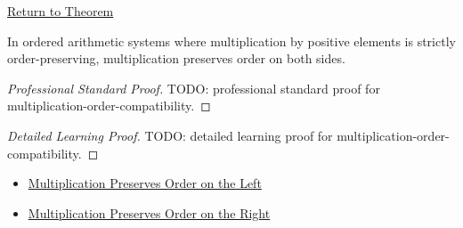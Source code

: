 \newpage
{}
\label{prf:multiplication-order-compatibility}

\begin{remark*}[Return]
\hyperref[prop:multiplication-order-compatibility]{Return to Theorem}
\end{remark*}

\begin{proposition*}
In ordered arithmetic systems where multiplication by positive elements is
strictly order-preserving, multiplication preserves order on both sides.
\end{proposition*}

\begin{proof}[Professional Standard Proof]
\LRAProofBodyStart
TODO: professional standard proof for multiplication-order-compatibility.
\end{proof}

\begin{proof}[Detailed Learning Proof]
\LRAProofBodyStart
TODO: detailed learning proof for multiplication-order-compatibility.
\end{proof}

\begin{remark*}
\end{remark*}

\begin{dependencies}
\begin{itemize}
  \item \hyperref[prop:multiplication-order-compatibility-left]{Multiplication Preserves Order on the Left}
  \item \hyperref[prop:multiplication-order-compatibility-right]{Multiplication Preserves Order on the Right}
\end{itemize}
\end{dependencies}

\clearpage
